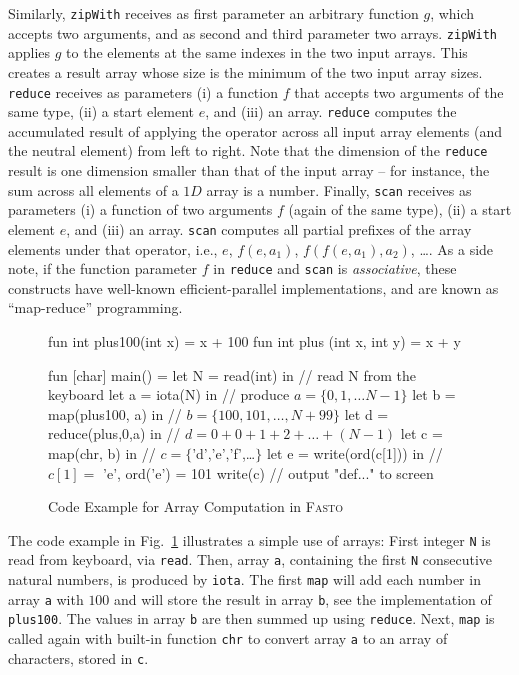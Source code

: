 \documentclass[a4paper,11pt]{article}
\newcommand{\fasto}{\textsc{Fasto}\xspace}
\begin{document}
Similarly, {\tt zipWith}
receives as first parameter an arbitrary function $g$, which accepts 
two arguments, and as second and third parameter two arrays. {\tt zipWith}
applies $g$ to the elements at the same
indexes in the two input arrays. This creates a result array whose size
is the minimum of the two input array sizes. {\tt reduce} receives
as parameters (i) a function $f$ that accepts two arguments of the same type,
(ii) a start element $e$, and (iii) an array. {\tt reduce} computes the
accumulated result of applying the operator across all input array elements
(and the neutral element) from left to right.
Note that the dimension of the {\tt reduce} result is one 
dimension smaller than that of the input array -- for instance, 
the sum across all elements of a $1D$ array is a number.
Finally, {\tt scan} receives as parameters (i) a function of two arguments 
$f$ (again of the same type), 
(ii) a start element $e$, and (iii) an array. {\tt scan} computes all partial 
prefixes of the array elements under that operator, 
i.e., $e$, $f(e,a_1)$, $f( f(e, a_1), a_2 )$, \ldots.
%
As a side note, if the function parameter $f$ in {\tt reduce} and {\tt scan} is
{\em associative}, these constructs have well-known efficient-parallel
implementations, and are known as ``map-reduce'' programming.

\begin{figure}[h]
\begin{fancycode}[frame=lines,label=\textit{Example}]
fun int plus100(int x) = x + 100
fun int plus (int x, int y) = x + y

fun [char] main() =
   let N = read(int) in        // read N from the keyboard
   let a = iota(N) in          // produce \(a = \{0,1,\ldots N-1\}\)
   let b = map(plus100, a)  in // \( b = \{100,101,\ldots,N+99\}\)
   let d = reduce(plus,0,a) in // \( d = 0+0+1+2+\ldots+(N-1)\)
   let c = map(chr, b) in      // \( c = \{\)'d','e','f',\ldots\(\}\)
   let e = write(ord(c[1])) in // \( c[1] = \) 'e',  ord('e') = 101  
   write(c)                    // output "def..." to screen
\end{fancycode}
\vspace*{-3ex}
\caption{Code Example for Array Computation in \fasto}
\label{fig:FastoMap} 
\end{figure}

The code example in Fig.~\ref{fig:FastoMap} illustrates
a simple use of arrays: First integer {\tt N} is read from keyboard, via {\tt read}.
Then, array {\tt a}, containing the first {\tt N} consecutive natural
numbers, is produced by {\tt iota}. The first {\tt map} will
add each number in array {\tt a} with $100$ and will store the result
in array {\tt b}, see the implementation of {\tt plus100}. 
%
The values in array \texttt{b} are then summed up using {\tt reduce}.
Next, {\tt map} is called again with built-in function {\tt chr} to
convert array {\tt a} to an array of characters, stored in {\tt c}.
\end{document}

